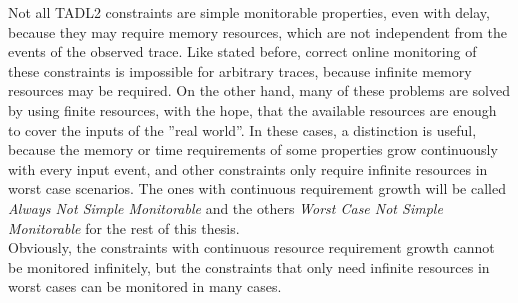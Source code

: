 	
		Not all TADL2 constraints are simple monitorable properties, even with delay, because they may require memory resources, which are not independent from the events of the observed trace. Like stated before, correct online monitoring of these constraints is impossible for arbitrary traces, because infinite memory resources may be required. On the other hand, many of these problems are solved by using finite resources, with the hope, that the available resources are enough to cover the inputs of the ''real world''.
		In these cases, a distinction is useful, because the memory or time requirements of some properties grow continuously with every input event, and other constraints only require infinite resources in worst case scenarios. 
		The ones with continuous requirement growth will be called \emph{Always Not Simple Monitorable} and the others \emph{Worst Case Not Simple Monitorable} for the rest of this thesis.\\
		Obviously, the constraints with continuous resource requirement growth cannot be monitored infinitely, but the constraints that only need infinite resources in worst cases can be monitored in many cases.

	 
